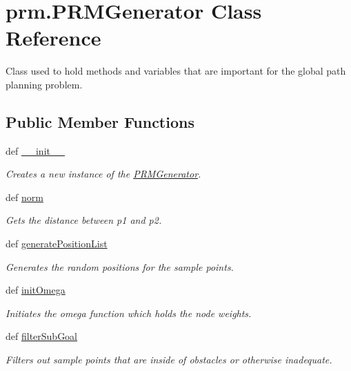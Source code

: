\hypertarget{classprm_1_1PRMGenerator}{\section{prm.\-P\-R\-M\-Generator Class Reference}
\label{classprm_1_1PRMGenerator}
}


Class used to hold methods and variables that are important for the global path planning problem.  


\subsection*{Public Member Functions}
\begin{DoxyCompactItemize}
\item 
def \hyperlink{classprm_1_1PRMGenerator_ac4b13e231e5e29be30e993100bfffdec}{\-\_\-\-\_\-init\-\_\-\-\_\-}
\begin{DoxyCompactList}\small\item\em Creates a new instance of the \hyperlink{classprm_1_1PRMGenerator}{P\-R\-M\-Generator}. \end{DoxyCompactList}\item 
def \hyperlink{classprm_1_1PRMGenerator_a652b3c0fa11645f351c23635d7e62dda}{norm}
\begin{DoxyCompactList}\small\item\em Gets the distance between p1 and p2. \end{DoxyCompactList}\item 
def \hyperlink{classprm_1_1PRMGenerator_ad5ffd82c9245496759767b2791d3a2fa}{generate\-Position\-List}
\begin{DoxyCompactList}\small\item\em Generates the random positions for the sample points. \end{DoxyCompactList}\item 
def \hyperlink{classprm_1_1PRMGenerator_aaa44a7e209bb06af27c4120b78d70cfb}{init\-Omega}
\begin{DoxyCompactList}\small\item\em Initiates the omega function which holds the node weights. \end{DoxyCompactList}\item 
def \hyperlink{classprm_1_1PRMGenerator_a95608c8cfd4364e3b2a9d20709161365}{filter\-Sub\-Goal}
\begin{DoxyCompactList}\small\item\em Filters out sample points that are inside of obstacles or otherwise inadequate. \end{DoxyCompactList}\item 

\end{DoxyCompactItemize}
